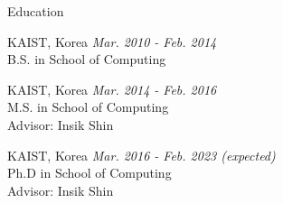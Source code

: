
\begin{rSection}{Education}

KAIST, Korea \hfill {\em Mar. 2010 - Feb. 2014} \\
B.S. in School of Computing

KAIST, Korea \hfill {\em Mar. 2014 - Feb. 2016} \\
M.S. in School of Computing \\
Advisor: Insik Shin

KAIST, Korea \hfill {\em Mar. 2016 - Feb. 2023 (expected)} \\
Ph.D in School of Computing \\
Advisor: Insik Shin

\end{rSection}
